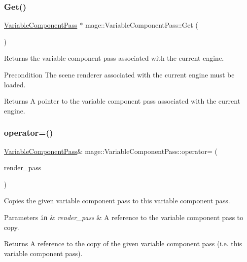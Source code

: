 \subsubsection{\texorpdfstring{Get()}{Get()}}
{\footnotesize\ttfamily \hyperlink{classmage_1_1_variable_component_pass}{Variable\+Component\+Pass} $\ast$ mage\+::\+Variable\+Component\+Pass\+::\+Get (\begin{DoxyParamCaption}{ }\end{DoxyParamCaption})\hspace{0.3cm}{\ttfamily [static]}}

Returns the variable component pass associated with the current engine.

\begin{DoxyPrecond}{Precondition}
The scene renderer associated with the current engine must be loaded. 
\end{DoxyPrecond}
\begin{DoxyReturn}{Returns}
A pointer to the variable component pass associated with the current engine. 
\end{DoxyReturn}
\hypertarget{classmage_1_1_variable_component_pass_a9df39d8323fea2b411a4f84abe8bac3c}{}\label{classmage_1_1_variable_component_pass_a9df39d8323fea2b411a4f84abe8bac3c} 
\subsubsection{\texorpdfstring{operator=()}{operator=()}\hspace{0.1cm}{\footnotesize\ttfamily [1/2]}}
{\footnotesize\ttfamily \hyperlink{classmage_1_1_variable_component_pass}{Variable\+Component\+Pass}\& mage\+::\+Variable\+Component\+Pass\+::operator= (\begin{DoxyParamCaption}\item[{const \hyperlink{classmage_1_1_variable_component_pass}{Variable\+Component\+Pass} \&}]{render\+\_\+pass }\end{DoxyParamCaption})\hspace{0.3cm}{\ttfamily [delete]}}

Copies the given variable component pass to this variable component pass.


\begin{DoxyParams}[1]{Parameters}
\mbox{\tt in}  & {\em render\+\_\+pass} & A reference to the variable component pass to copy. \\
\hline
\end{DoxyParams}
\begin{DoxyReturn}{Returns}
A reference to the copy of the given variable component pass (i.\+e. this variable component pass). 
\end{DoxyReturn}
\hypertarget{classmage_1_1_variable_component_pass_ab4c2ccc632031ec51c16f7c9d500e427}{}\label{classmage_1_1_variable_component_pass_ab4c2ccc632031ec51c16f7c9d500e427} 
